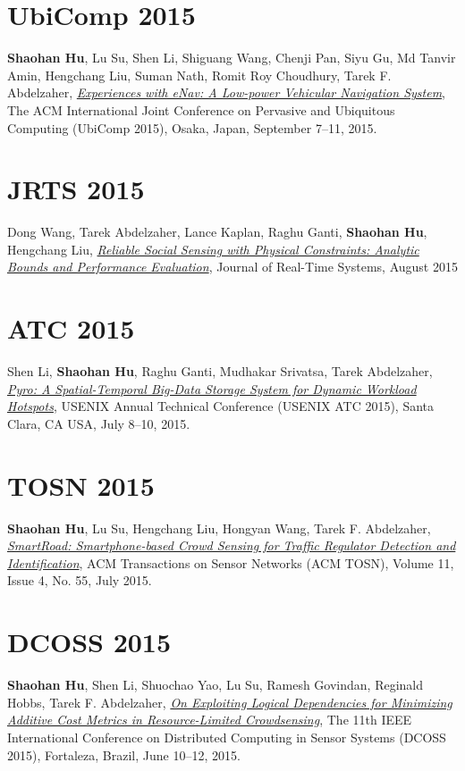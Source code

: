 \section{\sc UbiComp 2015}\hypertarget{hu2015ubicomp}{} \textbf{Shaohan Hu}, Lu Su, Shen Li, Shiguang Wang, Chenji Pan, Siyu Gu, Md Tanvir Amin, Hengchang Liu, Suman Nath, Romit Roy Choudhury, Tarek F. Abdelzaher, \href{http://dl.acm.org/citation.cfm?id=2804287}{\emph{Experiences with eNav: A Low-power Vehicular Navigation System}}, \textsf{The ACM International Joint Conference on Pervasive and Ubiquitous Computing (UbiComp 2015)}, Osaka, Japan, September 7--11, 2015.

\section{\sc JRTS 2015}\hypertarget{wang2015jrts}{} Dong Wang, Tarek Abdelzaher, Lance Kaplan, Raghu Ganti, \textbf{Shaohan Hu}, Hengchang Liu, \href{http://link.springer.com/article/10.1007%2Fs11241-015-9238-8}{\emph{Reliable Social Sensing with Physical Constraints: Analytic Bounds and Performance Evaluation}}, \textsf{Journal of Real-Time Systems}, August 2015

\section{\sc ATC 2015}\hypertarget{li2015atc}{} Shen Li, \textbf{Shaohan Hu}, Raghu Ganti, Mudhakar Srivatsa, Tarek Abdelzaher, \href{https://www.usenix.org/system/files/conference/atc15/atc15-paper-li-shen.pdf}{\emph{Pyro: A Spatial-Temporal Big-Data Storage System for Dynamic Workload Hotspots}}, \textsf{USENIX Annual Technical Conference (USENIX ATC 2015)}, Santa Clara, CA USA, July 8--10, 2015.

\section{\sc TOSN 2015}\hypertarget{hu2015tosn}{} \textbf{Shaohan Hu}, Lu Su, Hengchang Liu, Hongyan Wang, Tarek F. Abdelzaher, \href{http://dl.acm.org/citation.cfm?id=2770876}{\emph{SmartRoad: Smartphone-based Crowd Sensing for Traffic Regulator Detection and Identification}}, \textsf{ACM Transactions on Sensor Networks (ACM TOSN)}, Volume 11, Issue 4, No. 55, July 2015.

\section{\sc DCOSS 2015}\hypertarget{hu2015dcoss}{} \textbf{Shaohan Hu}, Shen Li, Shuochao Yao, Lu Su, Ramesh Govindan, Reginald Hobbs, Tarek F. Abdelzaher, \href{http://ieeexplore.ieee.org/xpl/articleDetails.jsp?arnumber=7165037}{\emph{On Exploiting Logical Dependencies for Minimizing Additive Cost Metrics in Resource-Limited Crowdsensing}}, \textsf{The 11th IEEE International Conference on Distributed Computing in Sensor Systems (DCOSS 2015)}, Fortaleza, Brazil, June 10--12, 2015.

